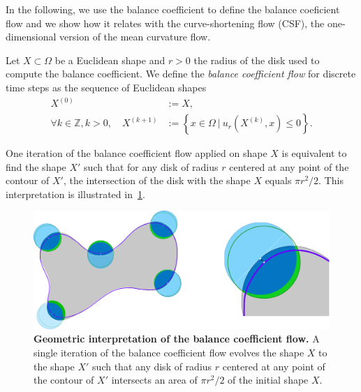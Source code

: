 \documentclass[review]{siamart220329}
\newcommand{\Z}{\mathbb{Z}}
\begin{document}
In the following, we use the balance coefficient to define the balance
coeficient flow and we show how it relates with the curve-shortening
flow (CSF), the one-dimensional version of the mean curvature flow.

\begin{definition}
  Let $X \subset \Omega$ be a Euclidean shape and $r>0$ the radius of the disk used to compute the balance coefficient. We define the \emph{balance coefficient flow} for discrete time steps as the sequence of Euclidean shapes
%
%
\begin{align}
  X^{(0)} & := X, \nonumber \\
  \forall k \in \Z, k > 0, \quad X^{(k+1)} & := \left\{ x \in \Omega \: | \: u_r(X^{(k)}, x) \leq 0 \right\}. \label{eq-balance-coefficient-flow}
\end{align}
%
%
\end{definition}
%
%
 One iteration of the balance coefficient flow applied on shape $X$ is equivalent to find the shape $X'$ such that for any disk of radius $r$ centered at any point of the contour of $X'$, the intersection of the disk with the shape $X$ equals $\pi r^2/2$. This interpretation is illustrated in~\cref{fig:geometric-interpretation}.
%
% 
\begin{figure}
\center
\includegraphics[scale=0.25]{figures/zero-level-set/geometric-interpretation.png}
\caption{\textbf{Geometric interpretation of the balance coefficient flow.} A single iteration of the balance coefficient flow evolves the shape $X$ to the shape $X'$ such that any disk of radius $r$ centered at any point of the contour of $X'$ intersects  an area of $\pi r^2/2$ of the initial shape $X$.}
\label{fig:geometric-interpretation}
\end{figure}
% 
%
\end{document}
